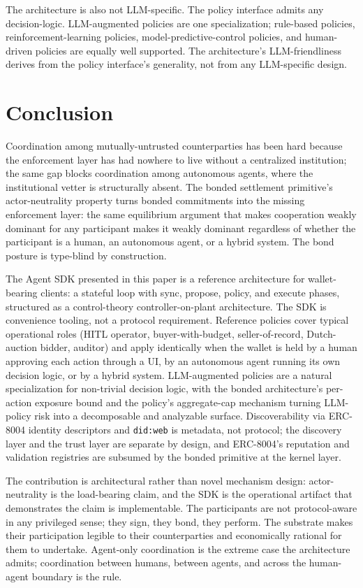 \documentclass[11pt,a4paper]{article}
\theoremstyle{definition}
\theoremstyle{remark}
\begin{document}
The architecture is also not LLM-specific. The policy interface
admits any decision-logic. LLM-augmented policies are one
specialization; rule-based policies, reinforcement-learning
policies, model-predictive-control policies, and human-driven
policies are equally well supported. The architecture's
LLM-friendliness derives from the policy interface's generality,
not from any LLM-specific design.

\section{Conclusion}
\label{sec:conclusion}

Coordination among mutually-untrusted counterparties has been hard
because the enforcement layer has had nowhere to live without a
centralized institution; the same gap blocks coordination among
autonomous agents, where the institutional vetter is structurally
absent. The bonded settlement primitive's actor-neutrality property
turns bonded commitments into the missing enforcement layer: the
same equilibrium argument that makes cooperation weakly dominant
for any participant makes it weakly dominant regardless of whether
the participant is a human, an autonomous agent, or a hybrid system.
The bond posture is type-blind by construction.

The Agent SDK presented in this paper is a reference architecture
for wallet-bearing clients: a stateful loop with sync, propose,
policy, and execute phases, structured as a control-theory
controller-on-plant architecture. The SDK is convenience tooling,
not a protocol requirement. Reference policies cover typical
operational roles (HITL operator, buyer-with-budget,
seller-of-record, Dutch-auction bidder, auditor) and apply
identically when the wallet is held by a human approving each
action through a UI, by an autonomous agent running its own
decision logic, or by a hybrid system. LLM-augmented policies are
a natural specialization for non-trivial decision logic, with the
bonded architecture's per-action exposure bound and the policy's
aggregate-cap mechanism turning LLM-policy risk into a decomposable
and analyzable surface. Discoverability via ERC-8004 identity
descriptors and \texttt{did:web} is metadata, not protocol; the
discovery layer and the trust layer are separate by design, and
ERC-8004's reputation and validation registries are subsumed by
the bonded primitive at the kernel layer.

The contribution is architectural rather than novel mechanism
design: actor-neutrality is the load-bearing claim, and the SDK is
the operational artifact that demonstrates the claim is implementable.
The participants are not protocol-aware in any privileged sense;
they sign, they bond, they perform. The substrate makes their
participation legible to their counterparties and economically
rational for them to undertake. Agent-only coordination is the
extreme case the architecture admits; coordination between humans,
between agents, and across the human-agent boundary is the rule.
\end{document}
